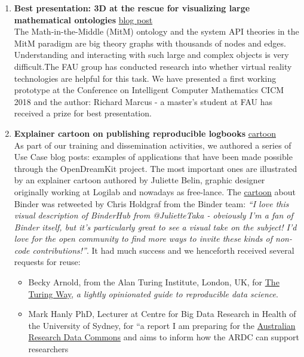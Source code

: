 \begin{enumerate}
\item \textbf{Best presentation: 3D at the rescue for visualizing large mathematical ontologies}
  \href{https://opendreamkit.org/2018/08/20/tgview3d.md}{blog post}\\
  The Math-in-the-Middle (MitM) ontology and the system API theories
  in the MitM paradigm are big theory graphs with thousands of nodes
  and edges. Understanding and interacting with such large and complex
  objects is very difficult.The FAU group has conducted research into
  whether virtual reality technologies are helpful for this task. We
  have presented a first working prototype at the Conference on
  Intelligent Computer Mathematics CICM 2018 and the author: Richard
  Marcus - a master's student at FAU has received a prize for best
  presentation.
\item \textbf{Explainer cartoon on publishing reproducible logbooks}
  \href{https://opendreamkit.org/2017/11/02/use-case-publishing-reproducible-notebooks/}{cartoon}\\
  As part of our training and dissemination activities, we authored a
  series of Use Case blog posts: examples of applications that have
  been made possible through the OpenDreamKit project. The most
  important ones are illustrated by an explainer cartoon authored by
  Juliette Belin, graphic designer originally working at Logilab and
  nowadays as free-lance. The
  \href{https://opendreamkit.org/2017/11/02/use-case-publishing-reproducible-notebooks/}{cartoon}
  about Binder was retweeted by Chris Holdgraf from the Binder team:
  \emph{``I love this visual description of BinderHub from @JulietteTaka -
  obviously I'm a fan of Binder itself, but it's particularly great to
  see a visual take on the subject! I'd love for the open community to
  find more ways to invite these kinds of non-code contributions!''}.
  It had much success and we henceforth received several requests for
  reuse:
  \begin{itemize}
  \item Becky Arnold, from the Alan Turing Institute, London, UK, for
    \href{https://the-turing-way.netlify.com/reproducible_environments/04/binder/}{The
      Turing Way}, \emph{a lightly opinionated guide to reproducible
      data science}.
  \item Mark Hanly PhD, Lecturer at Centre for Big Data Research in
    Health of the University of Sydney, for ``a report I am preparing
    for the \href{https://ardc.edu.au/}{Australian Research Data
      Commons} and aims to inform how the ARDC can support researchers

\end{itemize}
\end{enumerate}
